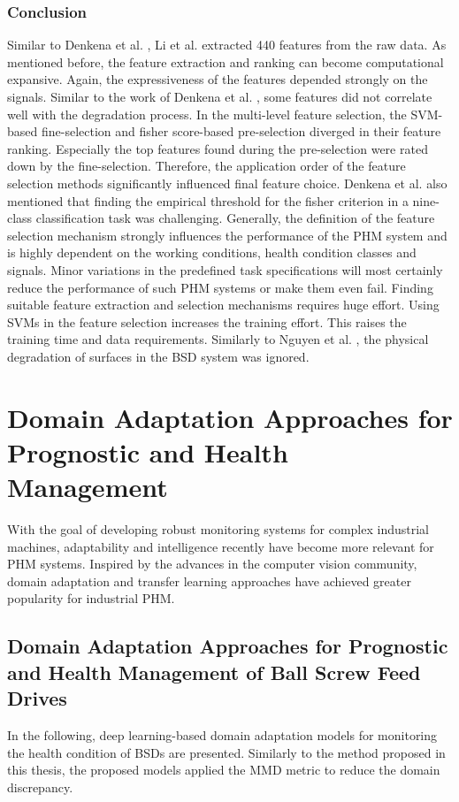 \subsubsection{Conclusion}
Similar to Denkena et al. \cite{Denkena2021}, Li et al. \cite{LiPin2018} extracted 440 features from the raw data. As mentioned before, the feature extraction and ranking can become computational expansive. Again, the expressiveness of the features depended strongly on the signals. Similar to the work of Denkena et al. \cite{Denkena2021}, some features did not correlate well with the degradation process. In the multi-level feature selection, the SVM-based fine-selection and fisher score-based pre-selection diverged in their feature ranking. Especially the top features found during the pre-selection were rated down by the fine-selection. Therefore, the application order of the feature selection methods significantly influenced final feature choice. Denkena et al. \cite{Denkena2021} also mentioned that finding the empirical threshold for the fisher criterion in a nine-class classification task was challenging. Generally, the definition of the feature selection mechanism strongly influences the performance of the PHM system and is highly dependent on the working conditions, health condition classes and signals. Minor variations in the predefined task specifications will most certainly reduce the performance of such PHM systems or make them even fail. Finding suitable feature extraction and selection mechanisms requires huge effort. Using SVMs in the feature selection increases the training effort. This raises the training time and data requirements. Similarly to Nguyen et al. \cite{NGUYEN2019}, the physical degradation of surfaces in the BSD system was ignored. 


\section{Domain Adaptation Approaches for Prognostic and Health Management} \label{sec:domain_adaption_approach}
With the goal of developing robust monitoring systems for complex industrial machines, adaptability and intelligence recently have become more relevant for PHM systems. Inspired by the advances in the computer vision community, domain adaptation and transfer learning approaches have achieved greater popularity for industrial PHM. 

\subsection{Domain Adaptation Approaches for Prognostic and Health Management of Ball Screw Feed Drives}
In the following, deep learning-based domain adaptation models for monitoring the health condition of BSDs are presented. Similarly to the method proposed in this thesis, the proposed models applied the MMD metric to reduce the domain discrepancy.


